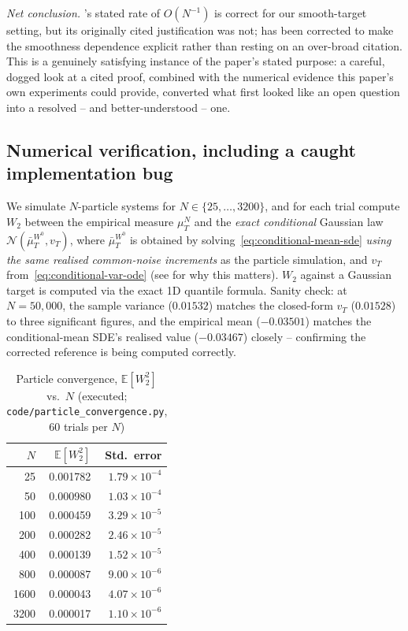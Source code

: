 \documentclass[11pt]{article}
\theoremstyle{remark}
\begin{document}
\emph{Net conclusion.} 's stated rate of $O(N^{-1})$ is correct
for our smooth-target setting, but its originally cited justification was not;
\citet{monyimba2026thesis} has been corrected to make the smoothness dependence
explicit rather than resting on an over-broad citation. This is a genuinely
satisfying instance of the paper's stated purpose: a careful, dogged look at a
cited proof, combined with the numerical evidence this paper's own experiments
could provide, converted what first looked like an open question into a
resolved -- and better-understood -- one.

\subsection{Numerical verification, including a caught implementation bug}

We simulate $N$-particle systems for $N \in \{25,\ldots,3200\}$, and for each
trial compute $W_2$ between the empirical measure $\mu_T^N$ and the \emph{exact
conditional} Gaussian law $\mathcal{N}(\bar\mu_T^{W^0}, v_T)$, where
$\bar\mu_T^{W^0}$ is obtained by solving~\eqref{eq:conditional-mean-sde}
\emph{using the same realised common-noise increments} as the particle
simulation, and $v_T$ from~\eqref{eq:conditional-var-ode} (see
 for why this matters). $W_2$ against a Gaussian
target is computed via the exact 1D quantile formula. Sanity check: at
$N=50{,}000$, the sample variance ($0.01532$) matches the closed-form $v_T$
($0.01528$) to three significant figures, and the empirical mean ($-0.03501$)
matches the conditional-mean SDE's realised value ($-0.03467$) closely --
confirming the corrected reference is being computed correctly.

\begin{table}[ht]
\centering
\caption{Particle convergence, $\mathbb{E}[W_2^2]$ vs.\ $N$ (executed;
\texttt{code/particle\_convergence.py}, 60 trials per $N$)}
\label{tab:particle-results}
\begin{tabular}{rrr}
\toprule
$N$ & $\mathbb{E}[W_2^2]$ & Std.\ error \\
\midrule
25   & 0.001782 & $1.79\times10^{-4}$ \\
50   & 0.000980 & $1.03\times10^{-4}$ \\
100  & 0.000459 & $3.29\times10^{-5}$ \\
200  & 0.000282 & $2.46\times10^{-5}$ \\
400  & 0.000139 & $1.52\times10^{-5}$ \\
800  & 0.000087 & $9.00\times10^{-6}$ \\
1600 & 0.000043 & $4.07\times10^{-6}$ \\
3200 & 0.000017 & $1.10\times10^{-6}$ \\
\bottomrule
\end{tabular}
\end{table}
\end{document}
